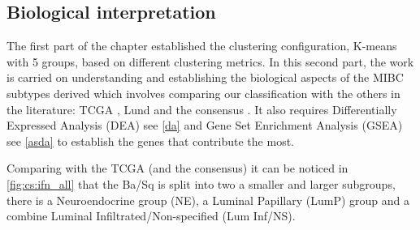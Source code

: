 \subsection{Biological interpretation} \label{s:cs:bio_interp}



The first part of the chapter established the clustering configuration, K-means with 5 groups, based on different clustering metrics. In this second part, the work is carried on understanding and establishing the biological aspects of the MIBC subtypes derived which involves comparing our classification with the others in the literature: TCGA \cite{Robertson2017-mg}, Lund \citet{Marzouka2018-ge} and the consensus \citet{Kamoun2020-tj}. It also requires Differentially Expressed Analysis (DEA) see \cref{da} and Gene Set Enrichment Analysis (GSEA) see \cref{asda} to establish the genes that contribute the most.


Comparing with the TCGA \citet{Robertson2017-mg} (and the consensus) it can be noticed in \cref{fig:cs:ifn_all} that the Ba/Sq is split into two a smaller and larger subgroups, there is a Neuroendocrine group (NE), a Luminal Papillary (LumP) group and a combine Luminal Infiltrated/Non-specified (Lum Inf/NS). 


